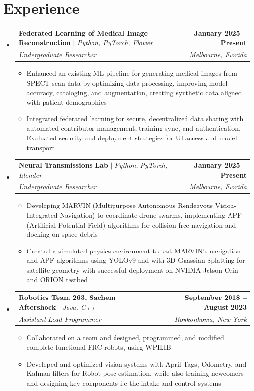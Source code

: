 \documentclass[letterpaper,11pt]{article}
\makeatletter
\newcommand{\resumeItem}[1]{
  \item\small{
    {#1 \vspace{-2pt}}
  }
}
\newcommand{\resumeSubheading}[4]{
  \vspace{-2pt}\item
    \begin{tabular*}{1.0\textwidth}[t]{l@{\extracolsep{\fill}}r}
      \small#1 & \textbf{\small #2} \\
      \textit{\small#3} & \textit{\small #4} \\
    \end{tabular*}\vspace{-9pt}
}
\newcommand{\resumeSubHeadingListStart}{\begin{itemize}[leftmargin=0.0in, label={}]}
\newcommand{\resumeSubHeadingListEnd}{\end{itemize}}
\newcommand{\resumeItemListStart}{\begin{itemize}}
\newcommand{\resumeItemListEnd}{\end{itemize}\vspace{-5pt}}
\makeatother
\begin{document}
\section{Experience}
  \resumeSubHeadingListStart
    \vspace{-2pt} %
    \resumeSubheading
      {\textbf{Federated Learning of Medical Image Reconstruction} $|$ \emph{Python, PyTorch, Flower}}{January 2025 -- Present}
      {Undergraduate Researcher}{Melbourne, Florida}
      \resumeItemListStart
        \resumeItem{Enhanced an existing ML pipeline for generating medical images from SPECT scan data by optimizing data processing, improving model accuracy, cataloging, and augmentation, creating synthetic data aligned with patient demographics}
        \resumeItem{Integrated federated learning for secure, decentralized data sharing with automated contributor management, training sync, and authentication. Evaluated security and deployment strategies for UI access and model transport}
    \resumeItemListEnd
    \vspace{-3pt} %
    \resumeSubheading
      {\textbf{Neural Transmissions Lab} $|$ \emph{Python, PyTorch, Blender}}{January 2025 -- Present}      
      {Undergraduate Researcher}{Melbourne, Florida}
      \resumeItemListStart
        \resumeItem{Developing MARVIN (Multipurpose Autonomous Rendezvous Vision-Integrated Navigation) to coordinate drone swarms, implementing APF (Artificial Potential Field) algorithms for collision-free navigation and docking on space debris}
        \resumeItem{Created a simulated physics environment to test MARVIN's navigation and APF algorithms using YOLOv9 and with 3D Guassian Splatting for satellite geometry with successful deployment on NVIDIA Jetson Orin and ORION testbed}
    \resumeItemListEnd
    \vspace{-3pt} %
    \resumeSubheading
      {\textbf{Robotics Team 263, Sachem Aftershock} $|$ \emph{Java, C++}}{September 2018 -- August 2023}
      {Assistant Lead Programmer}{Ronkonkoma, New York}
      \resumeItemListStart
        \resumeItem{Collaborated on a team and designed, programmed, and modified complete functional FRC robots, using WPILIB}
        \resumeItem{Developed and optimized vision systems with April Tags, Odometry, and Kalman filters for Robot pose estimation, while also training newcomers and designing key components i.e the intake and control systems}
      \resumeItemListEnd
  \resumeSubHeadingListEnd
\end{document}
